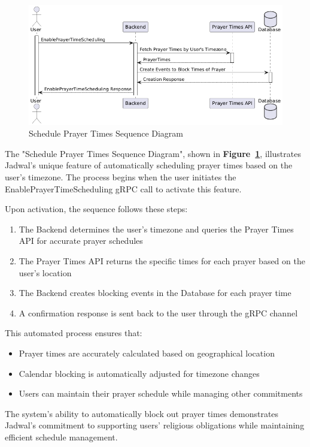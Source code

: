 \begin{figure}[!h]
  \centering
  \includegraphics[width=\textwidth]{images/docs/diagrams/sequence-diagrams/all-sequence-diagrams/Schedule Prayer Times.png}
  \caption{Schedule Prayer Times Sequence Diagram}
  \label{fig:seq/schedule-prayer-times}
\end{figure}

The "Schedule Prayer Times Sequence Diagram", shown in \textbf{Figure~\ref{fig:seq/schedule-prayer-times}}, illustrates Jadwal's unique feature of automatically scheduling prayer times based on the user's timezone. The process begins when the user initiates the EnablePrayerTimeScheduling gRPC call to activate this feature.

Upon activation, the sequence follows these steps:
\begin{enumerate}
  \item The Backend determines the user's timezone and queries the Prayer Times API for accurate prayer schedules
  \item The Prayer Times API returns the specific times for each prayer based on the user's location
  \item The Backend creates blocking events in the Database for each prayer time
  \item A confirmation response is sent back to the user through the gRPC channel
\end{enumerate}

This automated process ensures that:
\begin{itemize}
  \item Prayer times are accurately calculated based on geographical location
  \item Calendar blocking is automatically adjusted for timezone changes
  \item Users can maintain their prayer schedule while managing other commitments
\end{itemize}

The system's ability to automatically block out prayer times demonstrates Jadwal's commitment to supporting users' religious obligations while maintaining efficient schedule management.